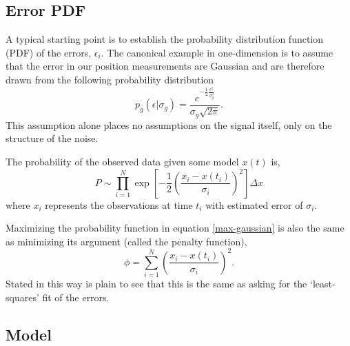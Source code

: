 \documentclass[twocol]{ametsoc}
\begin{document}
\subsection{Error PDF}

A typical starting point is to establish the probability distribution function (PDF) of the errors, $\epsilon_i$. The canonical example in one-dimension is to assume that the error in our position measurements are Gaussian and are therefore drawn from the following probability distribution
\begin{equation}
\label{gaussian_pdf}
p_g(\epsilon|\sigma_g) = \frac{e^{-\frac{1}{2}\frac{\epsilon^2}{\sigma_g^2}} }{\sigma_g \sqrt{ 2 \pi}}.
\end{equation}
This assumption alone places no assumptions on the signal itself, only on the structure of the noise.

The probability of the observed data given some model $x(t)$ is,
\begin{equation}
\label{max-gaussian}
P \sim \prod_{i=1}^{N}  \exp \left[ -\frac{1}{2} \left( \frac{x_i - x(t_i)}{\sigma_i} \right)^2 \right] \Delta x
\end{equation}
where $x_i$ represents the observations at time $t_i$ with estimated error of $\sigma_i$.

Maximizing the probability function in equation \ref{max-gaussian} is also the same as minimizing its argument (called the penalty function),
\begin{equation}
\label{least-squares}
\phi = \sum_{i=1}^{N} \left( \frac{x_i - x(t_i)}{\sigma_i} \right)^2 .
\end{equation}
Stated in this way is plain to see that this is the same as asking for the `least-squares' fit of the errors.

\subsection{Model}
\end{document}
